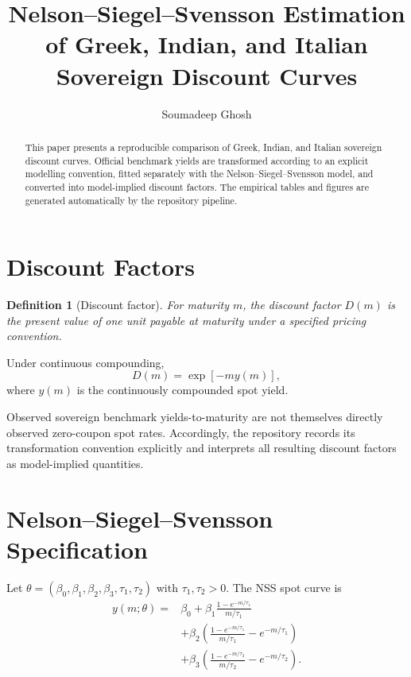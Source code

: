 \documentclass[12pt]{article}
\title{Nelson--Siegel--Svensson Estimation of Greek, Indian, and Italian Sovereign Discount Curves}
\author{Soumadeep Ghosh}
\date{}
\newtheorem{definition}{Definition}[section]
\begin{document}
\maketitle

\begin{abstract}
This paper presents a reproducible comparison of Greek, Indian, and Italian sovereign discount curves. Official benchmark yields are transformed according to an explicit modelling convention, fitted separately with the Nelson--Siegel--Svensson model, and converted into model-implied discount factors. The empirical tables and figures are generated automatically by the repository pipeline.
\end{abstract}

\section{Discount Factors}

\begin{definition}[Discount factor]
For maturity $m$, the discount factor $D(m)$ is the present value of one unit payable at maturity under a specified pricing convention.
\end{definition}

Under continuous compounding,
\begin{equation}
D(m)=\exp[-m y(m)],
\end{equation}
where $y(m)$ is the continuously compounded spot yield.

Observed sovereign benchmark yields-to-maturity are not themselves directly observed zero-coupon spot rates. Accordingly, the repository records its transformation convention explicitly and interprets all resulting discount factors as model-implied quantities.

\section{Nelson--Siegel--Svensson Specification}

Let $\theta=(\beta_0,\beta_1,\beta_2,\beta_3,\tau_1,\tau_2)$ with $\tau_1,\tau_2>0$. The NSS spot curve is
\begin{align}
y(m;\theta)={}&\beta_0+\beta_1\frac{1-e^{-m/\tau_1}}{m/\tau_1}\\
&+\beta_2\left(\frac{1-e^{-m/\tau_1}}{m/\tau_1}-e^{-m/\tau_1}\right)\\
&+\beta_3\left(\frac{1-e^{-m/\tau_2}}{m/\tau_2}-e^{-m/\tau_2}\right).
\end{align}
\end{document}
